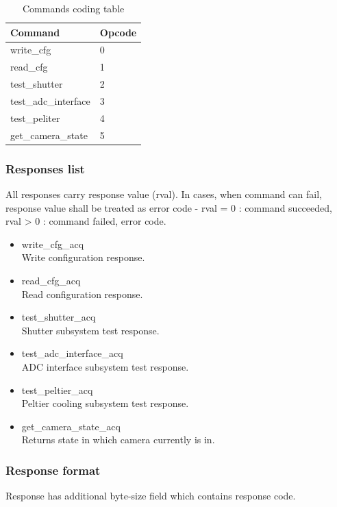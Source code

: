 \begin{table}[H]
\begin{center}
    \begin{tabular}{ | l || l |}
    \hline
    Command 				& Opcode 	\\ \hline
	write\_cfg 			& 0 	\\ \hline
	read\_cfg			& 1 	\\ \hline
	test\_shutter		& 2 	\\ \hline
	test\_adc\_interface	& 3 	\\ \hline
	test\_peliter		& 4 	\\ \hline
	get\_camera\_state		& 5 	\\ \hline
    \end{tabular}
    \end{center}
    \caption{Commands coding table}
	\label{table:command_enc_table1}
\end{table}

\subsubsection{Responses list}
All responses carry response value (rval). In cases, when command can fail, response value shall be treated as error code - rval = 0 : command succeeded, rval > 0 : command failed, error code.

\begin{itemize}
\item write\_cfg\_acq \hfill \\
Write configuration response.
\item read\_cfg\_acq \hfill \\ 
Read configuration response.
\item test\_shutter\_acq \hfill \\ 
Shutter subsystem test response.
\item test\_adc\_interface\_acq \hfill \\ 
ADC interface subsystem test response.
\item test\_peltier\_acq \hfill \\
Peltier cooling subsystem test response.
\item get\_camera\_state\_acq \hfill \\
Returns state in which camera currently is in.
\end{itemize}

\subsubsection{Response format}
Response has additional byte-size field which contains response code.

